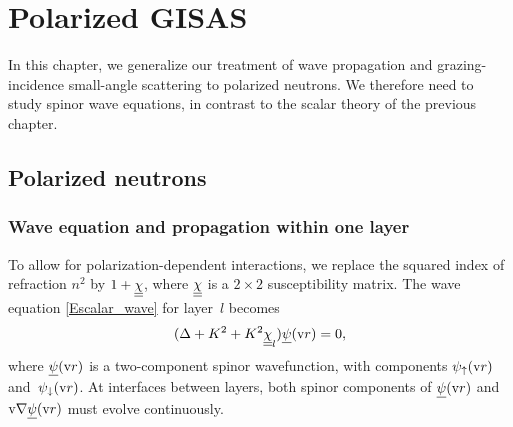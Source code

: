 
\chapter{Polarized GISAS}  \label{SPol}

In this chapter,
we generalize our treatment of wave propagation and
grazing-incidence small-angle scattering
to polarized neutrons.
We therefore need to study spinor wave equations,
in contrast to the scalar theory of the previous chapter.

\section{Polarized neutrons}\label{Snpol}




\subsection{Wave equation and propagation within one layer}


To allow for polarization-dependent interactions,
we replace the squared index of refraction $n^2$
by $1+\underline{\underline{\chi}}$, where $\underline{\underline{\chi}}$ is a $2\times 2$ susceptibility matrix.
The wave equation \cref{Escalar_wave} for layer~$l$ becomes
\begin{equation}\label{Ewaveqp}
(\Delta +K^2 +K^2 \underline{\underline{\chi}}_l) \underline{\psi}(\text{v}{r})= 0,
\end{equation}
where $\underline{\psi}(\text{v}{r})$ is a two-component spinor wavefunction,
with components $\psi_\uparrow(\text{v}{r})$ and~$\psi_\downarrow(\text{v}{r})$.
At interfaces between layers,
both spinor components of $\underline{\psi}(\text{v}{r})$ and $\text{v}{\nabla}\underline{\psi}(\text{v}{r})$
must evolve continuously.

